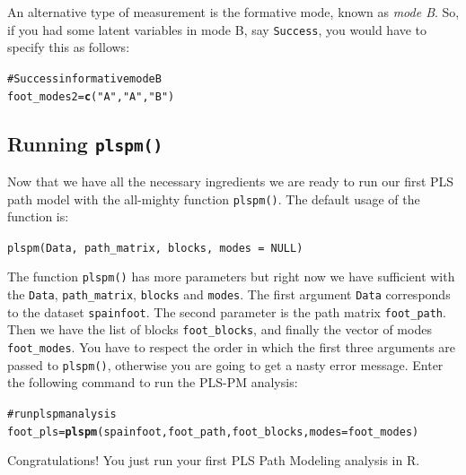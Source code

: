 \documentclass[12pt]{book}\usepackage{graphicx, color}
\makeatletter
\newcommand{\hlfunctioncall}[1]{\textcolor[rgb]{0.501960784313725,0,0.329411764705882}{\textbf{#1}}}%
\newcommand{\hlstring}[1]{\textcolor[rgb]{0.6,0.6,1}{#1}}%
\newcommand{\hlcomment}[1]{\textcolor[rgb]{0.180392156862745,0.6,0.341176470588235}{#1}}%
\newenvironment{kframe}{%
 \def\at@end@of@kframe{}%
 \ifinner\ifhmode%
  \def\at@end@of@kframe{\end{minipage}}%
  \begin{minipage}{\columnwidth}%
 \fi\fi%
 \def\FrameCommand##1{\hskip\@totalleftmargin \hskip-\fboxsep
 \colorbox{shadecolor}{##1}\hskip-\fboxsep
     \hskip-\linewidth \hskip-\@totalleftmargin \hskip\columnwidth}%
 \MakeFramed {\advance\hsize-\width
   \@totalleftmargin\z@ \linewidth\hsize
   \@setminipage}}%
 {\par\unskip\endMakeFramed%
 \at@end@of@kframe}
\newenvironment{knitrout}{}{} %
\newcommand{\fplspm}{\texttt{plspm()}}
\newcommand{\code}[1]{\texttt{#1}}
\makeatother
\begin{document}
An alternative type of measurement is the formative mode, known as \textit{mode B}. So, if you had some latent variables in mode B, say \texttt{Success}, you would have to specify this as follows:
\begin{knitrout}
\color{fgcolor}\begin{kframe}
\begin{alltt}
\hlcomment{# Success in formative mode B}
foot_modes2 = \hlfunctioncall{c}(\hlstring{"A"}, \hlstring{"A"}, \hlstring{"B"})
\end{alltt}
\end{kframe}
\end{knitrout}



\subsection{Running \fplspm{}}
Now that we have all the necessary ingredients we are ready to run our first PLS path model with the all-mighty function \fplspm{}. The default usage of the function is: 

\code{plspm(Data, path\_matrix, blocks, modes = NULL)}

The function \fplspm{} has more parameters but right now we have sufficient with the \code{Data}, \code{path\_matrix}, \code{blocks} and \code{modes}. The first argument \code{Data} corresponds to the dataset \code{spainfoot}. The second parameter is the path matrix \code{foot\_path}. Then we have the list of blocks \code{foot\_blocks}, and finally the vector of modes \code{foot\_modes}. You have to respect the order in which the first three arguments are passed to \fplspm{}, otherwise you are going to get a nasty error message. Enter the following command to run the PLS-PM analysis:
\begin{knitrout}
\color{fgcolor}\begin{kframe}
\begin{alltt}
\hlcomment{# run plspm analysis}
foot_pls = \hlfunctioncall{plspm}(spainfoot, foot_path, foot_blocks, modes = foot_modes)
\end{alltt}
\end{kframe}
\end{knitrout}

Congratulations! You just run your first PLS Path Modeling analysis in R.
\end{document}
